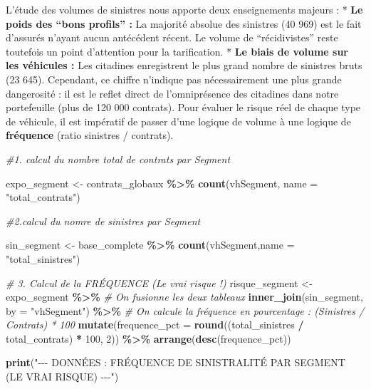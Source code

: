 \documentclass[
]{article}
\newenvironment{Shaded}{\begin{snugshade}}{\end{snugshade}}
\newcommand{\AttributeTok}[1]{\textcolor[rgb]{0.13,0.29,0.53}{#1}}
\newcommand{\CommentTok}[1]{\textcolor[rgb]{0.56,0.35,0.01}{\textit{#1}}}
\newcommand{\DecValTok}[1]{\textcolor[rgb]{0.00,0.00,0.81}{#1}}
\newcommand{\FunctionTok}[1]{\textcolor[rgb]{0.13,0.29,0.53}{\textbf{#1}}}
\newcommand{\NormalTok}[1]{#1}
\newcommand{\OtherTok}[1]{\textcolor[rgb]{0.56,0.35,0.01}{#1}}
\newcommand{\SpecialCharTok}[1]{\textcolor[rgb]{0.81,0.36,0.00}{\textbf{#1}}}
\newcommand{\StringTok}[1]{\textcolor[rgb]{0.31,0.60,0.02}{#1}}
\begin{document}
L'étude des volumes de sinistres nous apporte deux enseignements majeurs
: * \textbf{Le poids des ``bons profils'' :} La majorité absolue des
sinistres (40 969) est le fait d'assurés n'ayant aucun antécédent
récent. Le volume de ``récidivistes'' reste toutefois un point
d'attention pour la tarification. * \textbf{Le biais de volume sur les
véhicules :} Les citadines enregistrent le plus grand nombre de
sinistres bruts (23 645). Cependant, ce chiffre n'indique pas
nécessairement une plus grande dangerosité : il est le reflet direct de
l'omniprésence des citadines dans notre portefeuille (plus de 120 000
contrats). Pour évaluer le risque réel de chaque type de véhicule, il
est impératif de passer d'une logique de volume à une logique de
\textbf{fréquence} (ratio sinistres / contrats).

\begin{Shaded}
\begin{Highlighting}[]
\CommentTok{\#1. calcul du nombre total de contrats par Segment}

\NormalTok{expo\_segment }\OtherTok{\textless{}{-}}\NormalTok{ contrats\_globaux }\SpecialCharTok{\%\textgreater{}\%}
  \FunctionTok{count}\NormalTok{(vhSegment, }\AttributeTok{name =} \StringTok{"total\_contrats"}\NormalTok{)}

\CommentTok{\#2.calcul du nomre de sinistres par Segment}

\NormalTok{sin\_segment }\OtherTok{\textless{}{-}}\NormalTok{ base\_complete }\SpecialCharTok{\%\textgreater{}\%}
  \FunctionTok{count}\NormalTok{(vhSegment,}\AttributeTok{name =} \StringTok{"total\_sinistres"}\NormalTok{)}

\CommentTok{\# 3. Calcul de la FRÉQUENCE (Le vrai risque !)}
\NormalTok{risque\_segment }\OtherTok{\textless{}{-}}\NormalTok{ expo\_segment }\SpecialCharTok{\%\textgreater{}\%}
  \CommentTok{\# On fusionne les deux tableaux}
  \FunctionTok{inner\_join}\NormalTok{(sin\_segment, }\AttributeTok{by =} \StringTok{"vhSegment"}\NormalTok{) }\SpecialCharTok{\%\textgreater{}\%}
  \CommentTok{\# On calcule la fréquence en pourcentage : (Sinistres / Contrats) * 100}
  \FunctionTok{mutate}\NormalTok{(}\AttributeTok{frequence\_pct =} \FunctionTok{round}\NormalTok{((total\_sinistres }\SpecialCharTok{/}\NormalTok{ total\_contrats) }\SpecialCharTok{*} \DecValTok{100}\NormalTok{, }\DecValTok{2}\NormalTok{)) }\SpecialCharTok{\%\textgreater{}\%}
  \FunctionTok{arrange}\NormalTok{(}\FunctionTok{desc}\NormalTok{(frequence\_pct))}

\FunctionTok{print}\NormalTok{(}\StringTok{"{-}{-}{-} DONNÉES : FRÉQUENCE DE SINISTRALITÉ PAR SEGMENT (LE VRAI RISQUE) {-}{-}{-}"}\NormalTok{)}
\end{Highlighting}
\end{Shaded}
\end{document}
